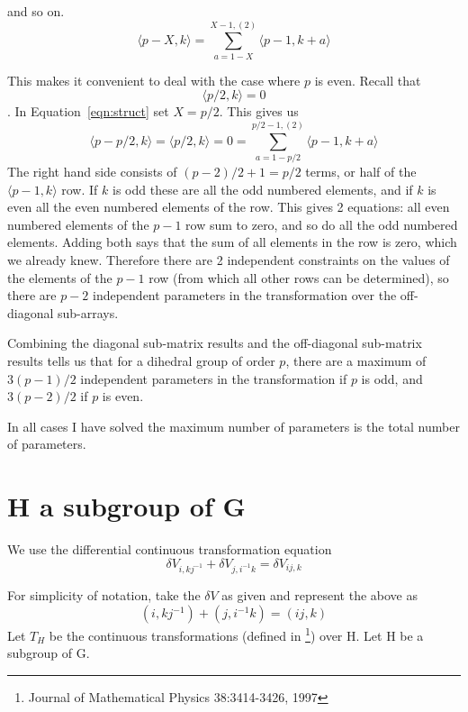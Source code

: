\documentclass{revtex4-1}
\begin{document}
and so on.
\begin{equation} \label{eqn:struct}
\langle p-X, k \rangle = \sum_{a=1-X}^{X-1 , (2)} \langle p-1, k+a \rangle
\end{equation}

This makes it convenient to deal with the case where $p$ is even.  Recall that
$$\langle p/2, k \rangle=0$$.  In Equation~\ref{eqn:struct} set $X=p/2$.  This gives us
\begin{equation}
\langle p-p/2, k \rangle = \langle p/2, k \rangle = 0 = \sum_{a=1-p/2}^{p/2-1, (2)} \langle p-1, k+a \rangle
\end{equation}
The right hand side consists of $(p-2)/2 +1 =p/2$ terms, or half of the $\langle p-1,  k \rangle$ row.
If $k$ is odd these are all the odd numbered elements, and if $k$ is even all the even numbered
elements of the row.  This gives 2 equations:  all even numbered elements of the $p-1$ row
sum to zero, and so do all the odd numbered elements.  Adding both says that the sum of all
elements in the row is zero, which we already knew.  Therefore there are 2 independent
constraints on the values of the elements of the $p-1$ row (from which all other rows can
be determined), so there are $p-2$ independent parameters in the transformation over the 
off-diagonal sub-arrays.

\par Combining the diagonal sub-matrix results and the off-diagonal sub-matrix results tells us
that for a dihedral group of order $p$, there are a maximum of $3(p-1)/2$ independent
parameters in the transformation if $p$ is odd, and $3(p-2)/2$ if $p$ is even.

\par In all cases I have solved the maximum number of parameters is the total number of parameters.
\section{H a subgroup of G}

We use the differential continuous transformation equation
\begin{equation}
\delta V_{i,kj^{-1}} + \delta V_{j,i^{-1}k} = \delta V_{ij,k}
\end{equation}
\par For simplicity of notation, take the $\delta V$ as given and
represent the above as 
\begin{equation}
(i,kj^{-1})+ (j,i^{-1}k) = (ij,k)
\end{equation}
Let $T_H$ be the continuous transformations (defined in 
\footnote{Journal of Mathematical Physics 38:3414-3426, 1997}) over H. Let H be a subgroup of G.
\end{document}
